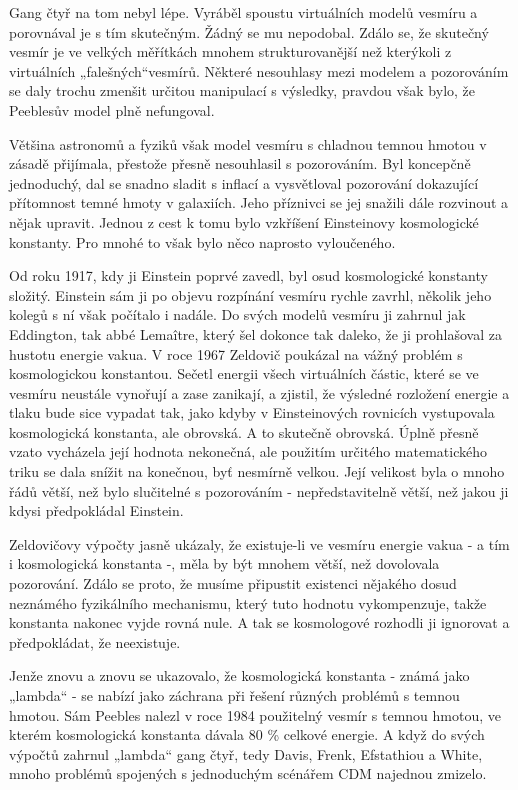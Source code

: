   Gang čtyř na tom nebyl lépe. Vyráběl spoustu virtuálních modelů vesmíru a porovnával je s tím
  skutečným. Žádný se mu nepodobal. Zdálo se, že skutečný vesmír je ve velkých měřítkách mnohem
  strukturovanější než kterýkoli z virtuálních „falešných“vesmírů. Některé nesouhlasy mezi modelem a
  pozorováním se daly trochu zmenšit určitou manipulací s výsledky, pravdou však bylo, že Peeblesův
  model plně nefungoval. 
  
  Většina astronomů a fyziků však model vesmíru s chladnou temnou hmotou v zásadě přijímala,
  přestože přesně nesouhlasil s pozorováním. Byl koncepčně jednoduchý, dal se snadno sladit s
  inflací a vysvětloval pozorování dokazující přítomnost temné hmoty v galaxiích. Jeho příznivci se
  jej snažili dále rozvinout a nějak upravit. Jednou z cest k tomu bylo vzkříšení Einsteinovy
  kosmologické konstanty. Pro mnohé to však bylo něco naprosto vyloučeného. 
  
  Od roku 1917, kdy ji Einstein poprvé zavedl, byl osud kosmologické konstanty složitý. Einstein sám
  ji po objevu rozpínání vesmíru rychle zavrhl, několik jeho kolegů s ní však počítalo i nadále. Do
  svých modelů vesmíru ji zahrnul jak Eddington, tak abbé Lemaître, který šel dokonce tak daleko, že
  ji prohlašoval za hustotu energie vakua. V roce 1967 Zeldovič poukázal na vážný problém s
  kosmologickou konstantou. Sečetl energii všech virtuálních částic, které se ve vesmíru neustále
  vynořují a zase zanikají, a zjistil, že výsledné rozložení energie a tlaku bude sice vypadat tak,
  jako kdyby v Einsteinových rovnicích vystupovala kosmologická konstanta, ale obrovská. A to
  skutečně obrovská. Úplně přesně vzato vycházela její hodnota nekonečná, ale použitím určitého
  matematického triku se dala snížit na konečnou, byť nesmírně velkou. Její velikost byla o mnoho
  řádů větší, než bylo slučitelné s pozorováním - nepředstavitelně větší, než jakou ji kdysi
  předpokládal Einstein. 
  
  Zeldovičovy výpočty jasně ukázaly, že existuje-li ve vesmíru energie vakua - a tím i kosmologická
  konstanta -, měla by být mnohem větší, než dovolovala pozorování. Zdálo se proto, že musíme
  připustit existenci nějakého dosud neznámého fyzikálního mechanismu, který tuto hodnotu
  vykompenzuje, takže konstanta nakonec vyjde rovná nule. A tak se kosmologové rozhodli ji ignorovat
  a předpokládat, že neexistuje. 
  
  Jenže znovu a znovu se ukazovalo, že kosmologická konstanta - známá jako „lambda“ - se nabízí jako
  záchrana při řešení různých problémů s temnou hmotou. Sám Peebles nalezl v roce 1984 použitelný
  vesmír s temnou hmotou, ve kterém kosmologická konstanta dávala 80 \% celkové energie. A když do
  svých výpočtů zahrnul „lambda“ gang čtyř, tedy Davis, Frenk, Efstathiou a White, mnoho problémů
  spojených s jednoduchým scénářem CDM najednou zmizelo. 
  
